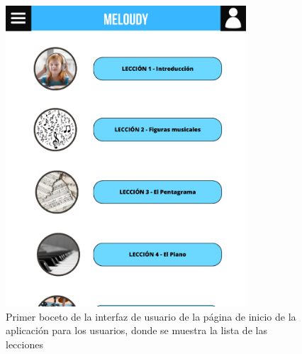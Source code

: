 \begin{figure}[H]

    \centering
    \includegraphics[width=0.8\textwidth]{imagenes/c3/boceto.png}
    \caption{Primer boceto de la interfaz de usuario de la página de inicio de la aplicación para los usuarios, donde se muestra la lista de las lecciones}
    \label{fig:artly}

\end{figure}